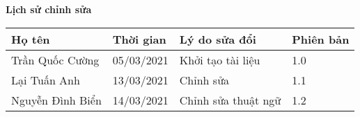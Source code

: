 \documentclass[./main.tex]{subfiles}
\begin{document}
	\begin{center}
		\Large{\textbf{Lịch sử chỉnh sửa}}
		\begin{table}[H]
\begin{tabular}{|p{}|p{}|p{}|p{}|}
				\hline
				\textbf{Họ tên}  & \textbf{Thời gian} & \textbf{Lý do sửa đổi} & \textbf{Phiên bản} \\ \hline
				Trần Quốc Cường  & 05/03/2021         & Khởi tạo tài liệu      & 1.0                \\ \hline
				Lại Tuấn Anh     & 13/03/2021         & Chỉnh sửa              & 1.1                \\ \hline
				Nguyễn Đình Biển & 14/03/2021         & Chỉnh sửa thuật ngữ    & 1.2                \\ \hline
			\end{tabular}
		\end{table}
	\end{center}
	
\end{document}
